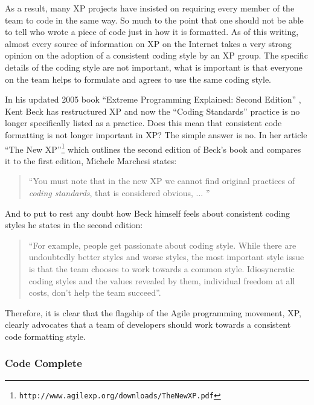 As a result, many XP projects have insisted on requiring every member of the
team to code in the same way.  So much to the point that one should not be
able to tell who wrote a piece of code just in how it is formatted.  As of
this writing, almost every source of information on XP on the Internet takes
a very strong opinion on the adoption of a consistent coding style by an XP
group.  The specific details of the coding style are not important, what is
important is that everyone on the team helps to formulate and agrees to use
the same coding style.

In his updated 2005 book ``Extreme Programming Explained: Second Edition''
{}\cite{ExtremeProgrammingExplained2nd04}, Kent Beck has restructured XP and
now the ``Coding Standards'' practice is no longer specifically listed as a
practice.  Does this mean that consistent code formatting is not longer
important in XP?  The simple answer is no.  In her article ``The New
XP''\footnote{ {}\texttt{http://www.agilexp.org/downloads/TheNewXP.pdf} }
which outlines the second edition of Beck's book and compares it to the first
edition, Michele Marchesi states:

\begin{quote}

``You must note that in the new XP we cannot find original practices of
{}\textit{coding standards}, that is considered obvious, ... ''

\end{quote}

And to put to rest any doubt how Beck himself feels about consistent coding
styles he states in the second edition:

\begin{quote}

``For example, people get passionate about coding style.  While there are
undoubtedly better styles and worse styles, the most important style issue is
that the team chooses to work towards a common style.  Idiosyncratic coding
styles and the values revealed by them, individual freedom at all costs, don't
help the team succeed''.

\end{quote}

Therefore, it is clear that the flagship of the Agile programming movement,
XP, clearly advocates that a team of developers should work towards a
consistent code formatting style.

%
\subsubsection{Code Complete}
%

